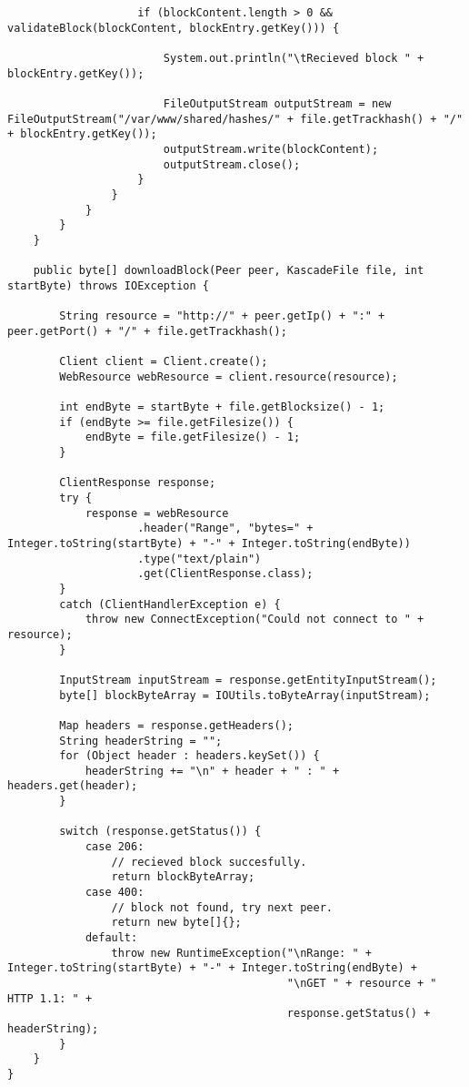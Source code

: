 \documentclass{acm_proc_article-sp}
\begin{document}
\begin{lstlisting}
                    if (blockContent.length > 0 && validateBlock(blockContent, blockEntry.getKey())) {

                        System.out.println("\tRecieved block " + blockEntry.getKey());

                        FileOutputStream outputStream = new FileOutputStream("/var/www/shared/hashes/" + file.getTrackhash() + "/" + blockEntry.getKey());
                        outputStream.write(blockContent);
                        outputStream.close();
                    }
                }
            }
        }
    }

    public byte[] downloadBlock(Peer peer, KascadeFile file, int startByte) throws IOException {

        String resource = "http://" + peer.getIp() + ":" + peer.getPort() + "/" + file.getTrackhash();

        Client client = Client.create();
        WebResource webResource = client.resource(resource);

        int endByte = startByte + file.getBlocksize() - 1;
        if (endByte >= file.getFilesize()) {
            endByte = file.getFilesize() - 1;
        }

        ClientResponse response;
        try {
            response = webResource
                    .header("Range", "bytes=" + Integer.toString(startByte) + "-" + Integer.toString(endByte))
                    .type("text/plain")
                    .get(ClientResponse.class);
        }
        catch (ClientHandlerException e) {
            throw new ConnectException("Could not connect to " + resource);
        }

        InputStream inputStream = response.getEntityInputStream();
        byte[] blockByteArray = IOUtils.toByteArray(inputStream);

        Map headers = response.getHeaders();
        String headerString = "";
        for (Object header : headers.keySet()) {
            headerString += "\n" + header + " : " + headers.get(header);
        }

        switch (response.getStatus()) {
            case 206:
                // recieved block succesfully.
                return blockByteArray;
            case 400:
                // block not found, try next peer.
                return new byte[]{};
            default:
                throw new RuntimeException("\nRange: " + Integer.toString(startByte) + "-" + Integer.toString(endByte) +
                                           "\nGET " + resource + " HTTP 1.1: " +
                                           response.getStatus() + headerString);
        }
    }
}
\end{lstlisting}
\end{document}
